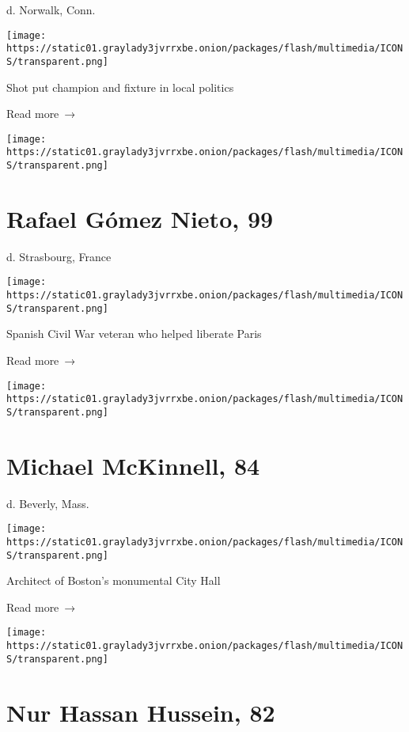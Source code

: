 d. Norwalk, Conn.

\texttt{[image: https://static01.graylady3jvrrxbe.onion/packages/flash/multimedia/ICONS/transparent.png]}

Shot put champion and fixture in local politics

 Read more~→

\href{https://www.nytimes3xbfgragh.onion/2020/04/05/obituaries/rafael-gomez-nieto-dead.html}{}

\texttt{[image: https://static01.graylady3jvrrxbe.onion/packages/flash/multimedia/ICONS/transparent.png]}

\hypertarget{rafael-guxf3mez-nieto-99}{%
\section{Rafael Gómez Nieto, 99}\label{rafael-guxf3mez-nieto-99}}

d. Strasbourg, France

\texttt{[image: https://static01.graylady3jvrrxbe.onion/packages/flash/multimedia/ICONS/transparent.png]}

Spanish Civil War veteran who helped liberate Paris

 Read more~→

\href{https://www.nytimes3xbfgragh.onion/2020/04/04/arts/design/michael-mckinnell-dead-coronavirus.html}{}

\texttt{[image: https://static01.graylady3jvrrxbe.onion/packages/flash/multimedia/ICONS/transparent.png]}

\hypertarget{michael-mckinnell-84}{%
\section{Michael McKinnell, 84}\label{michael-mckinnell-84}}

d. Beverly, Mass.

\texttt{[image: https://static01.graylady3jvrrxbe.onion/packages/flash/multimedia/ICONS/transparent.png]}

Architect of Boston's monumental City Hall

 Read more~→

\href{https://www.nytimes3xbfgragh.onion/2020/04/03/obituaries/nur-hussein-dead-coronavirus.html}{}

\texttt{[image: https://static01.graylady3jvrrxbe.onion/packages/flash/multimedia/ICONS/transparent.png]}

\hypertarget{nur-hassan-hussein-82}{%
\section{Nur Hassan Hussein, 82}\label{nur-hassan-hussein-82}}

